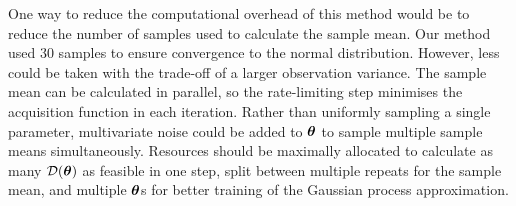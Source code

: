 One way to reduce the computational overhead of this method would be to reduce
the number of samples used to calculate the sample mean. Our method used
30 samples to ensure convergence to the normal distribution. However, less 
could be
taken with the trade-off of a larger observation variance. The sample mean
can be calculated in parallel, so the rate-limiting step minimises the
acquisition function in each iteration. Rather than uniformly sampling
a single parameter, multivariate noise could be added to
$\bm{\theta}$ to sample multiple sample means simultaneously.
Resources should be maximally allocated
to calculate as many $\mathcal{D}(\bm{\theta})$ as feasible in one step, split between
multiple repeats for the sample mean, and multiple $\bm{\theta}$s for better
training of the Gaussian process approximation.